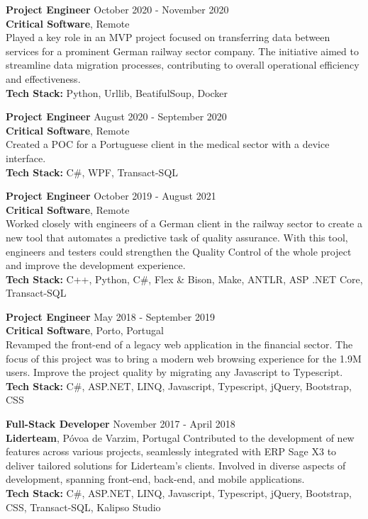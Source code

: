 \documentclass[margin, 10pt]{res} %
\begin{document}
\begin{resume}
    \textbf{Project Engineer} \hfill October 2020 - November 2020\\
    \textbf{Critical Software}, Remote\\
    Played a key role in an MVP project focused on transferring data between services for a prominent German railway sector company. The initiative aimed to streamline data migration processes, contributing to overall operational efficiency and effectiveness.\\
    \textbf {Tech Stack:} Python, Urllib, BeatifulSoup, Docker


    \textbf{Project Engineer} \hfill August 2020 - September 2020\\
    \textbf{Critical Software}, Remote\\
    Created a POC for a Portuguese client in the medical sector with a device interface.\\
    \textbf {Tech Stack:} C\#, WPF, Transact-SQL


    \textbf{Project Engineer} \hfill October 2019 - August 2021\\
    \textbf{Critical Software}, Remote\\
    Worked closely with engineers of a German client in the railway sector to create a new tool that automates a predictive task of quality assurance. With this tool, engineers and testers could strengthen the Quality Control of the whole project and improve the development experience.\\  
    \textbf {Tech Stack:} C++, Python, C\#, Flex \& Bison, Make, ANTLR, ASP .NET Core, Transact-SQL


    \textbf{Project Engineer} \hfill May 2018 - September 2019\\
    \textbf{Critical Software}, Porto, Portugal\\
    Revamped the front-end of a legacy web application in the financial sector. The focus of this project was to bring a modern web browsing experience for the 1.9M users. Improve the project quality by migrating any Javascript to Typescript.\\
    \textbf {Tech Stack:} C\#, ASP.NET, LINQ, Javascript, Typescript, jQuery, Bootstrap, CSS

    
    \textbf{Full-Stack Developer} \hfill November 2017 - April 2018\\
    \textbf{Liderteam}, Póvoa de Varzim, Portugal
    Contributed to the development of new features across various projects, seamlessly integrated with ERP Sage X3 to deliver tailored solutions for Liderteam's clients. Involved in diverse aspects of development, spanning front-end, back-end, and mobile applications.\\
    \textbf {Tech Stack:} C\#, ASP.NET, LINQ, Javascript, Typescript, jQuery, Bootstrap, CSS, Transact-SQL, Kalipso Studio


\end{resume}
\end{document}
